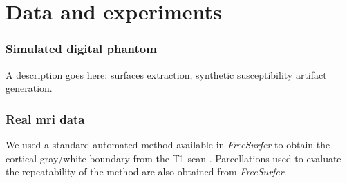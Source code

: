 \section{Data and experiments}
\label{sec:experiments}



\subsubsection{Simulated digital phantom} %
A description goes here: surfaces extraction, synthetic susceptibility artifact generation.

\subsubsection {Real \gls{mri} data} %

We used a standard automated method
available in \emph{FreeSurfer} \citep{fischl_freesurfer_2012} to obtain the
cortical gray/white boundary from the T1 scan \citep{greve_accurate_2009}.
Parcellations used to evaluate the repeatability of the method are also
obtained from \emph{FreeSurfer}.


